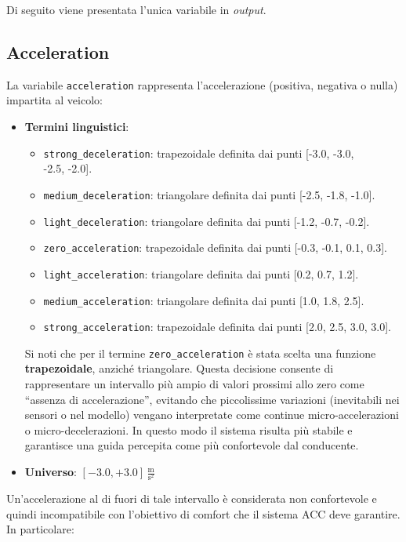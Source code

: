 \vspace{10mm}
\noindent Di seguito viene presentata l'unica variabile in \emph{output}.

\subsection{Acceleration}
La variabile \texttt{acceleration} rappresenta l'accelerazione (positiva, negativa o nulla) impartita al veicolo:
\begin{itemize}
  \item \textbf{Termini linguistici}:
    \begin{itemize}
      \item \texttt{strong\_deceleration}: trapezoidale definita dai punti [-3.0, -3.0, \\ -2.5, -2.0].
      \item \texttt{medium\_deceleration}: triangolare definita dai punti [-2.5, -1.8, -1.0].
      \item \texttt{light\_deceleration}: triangolare definita dai punti [-1.2, -0.7, -0.2].
      \item \texttt{zero\_acceleration}: trapezoidale definita dai punti [-0.3, -0.1, 0.1, 0.3].
      \item \texttt{light\_acceleration}: triangolare definita dai punti [0.2, 0.7, 1.2].
      \item \texttt{medium\_acceleration}: triangolare definita dai punti [1.0, 1.8, 2.5].
      \item \texttt{strong\_acceleration}: trapezoidale definita dai punti [2.0, 2.5, 3.0, 3.0].
    \end{itemize}
    \noindent Si noti che per il termine \texttt{zero\_acceleration} è stata scelta una funzione \textbf{trapezoidale}, anziché triangolare.  
  Questa decisione consente di rappresentare un intervallo più ampio di valori prossimi allo zero come “assenza di accelerazione”, evitando che piccolissime variazioni (inevitabili nei sensori o nel modello) vengano interpretate come continue micro-accelerazioni o micro-decelerazioni.  
  In questo modo il sistema risulta più stabile e garantisce una guida percepita come più confortevole dal conducente.
  \item \textbf{Universo}: \([-3.0,+3.0]\)\,$\frac{\mathrm{m}}{\mathrm{s^2}}$
\end{itemize}
Un'accelerazione al di fuori di tale intervallo è considerata non confortevole e quindi incompatibile con l'obiettivo di comfort che il sistema ACC deve garantire.  
In particolare:
